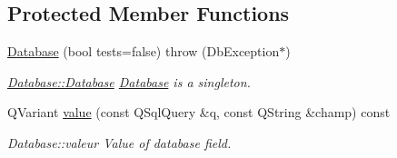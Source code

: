 \subsection*{Protected Member Functions}
\begin{DoxyCompactItemize}
\item 
\hypertarget{classDatabases_1_1Database_a2014dda2689bcdf325e8bce020a4b73c}{}\hyperlink{classDatabases_1_1Database_a2014dda2689bcdf325e8bce020a4b73c}{Database} (bool tests=false)  throw (\+Db\+Exception$\ast$)\label{classDatabases_1_1Database_a2014dda2689bcdf325e8bce020a4b73c}

\begin{DoxyCompactList}\small\item\em \hyperlink{classDatabases_1_1Database_a2014dda2689bcdf325e8bce020a4b73c}{Database\+::\+Database} \hyperlink{classDatabases_1_1Database}{Database} is a singleton. \end{DoxyCompactList}\item 
Q\+Variant \hyperlink{classDatabases_1_1Database_abac96d2e284c2f13b7fc692994059d74}{value} (const Q\+Sql\+Query \&q, const Q\+String \&champ) const 
\begin{DoxyCompactList}\small\item\em Database\+::valeur Value of database field. \end{DoxyCompactList}\end{DoxyCompactItemize}

